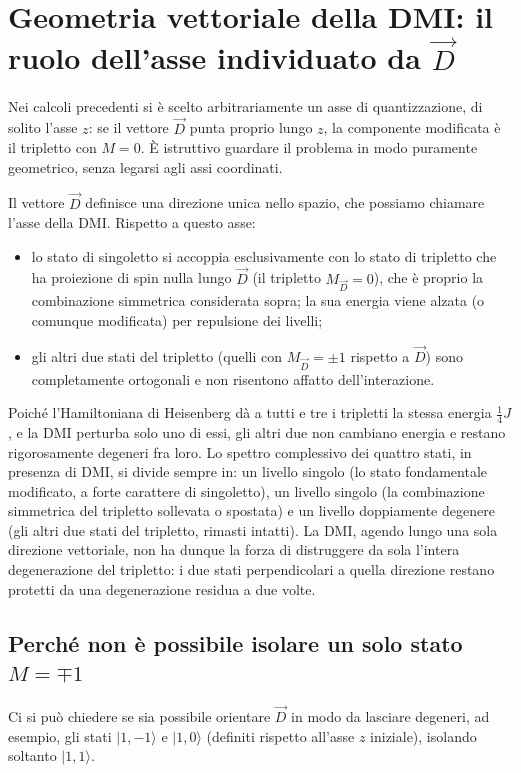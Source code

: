 \documentclass[11pt,a4paper]{article}
\begin{document}
\section{Geometria vettoriale della DMI: il ruolo dell'asse individuato da $\vec D$}

Nei calcoli precedenti si \`e scelto arbitrariamente un asse di quantizzazione, di
solito l'asse $z$: se il vettore $\vec D$ punta proprio lungo $z$, la componente
modificata \`e il tripletto con $M=0$. \`E istruttivo guardare il problema in modo
puramente geometrico, senza legarsi agli assi coordinati.

Il vettore $\vec D$ definisce una direzione unica nello spazio, che possiamo chiamare
l'asse della DMI. Rispetto a questo asse:
\begin{itemize}
\item lo stato di singoletto si accoppia esclusivamente con lo stato di tripletto che
ha proiezione di spin nulla lungo $\vec D$ (il tripletto $M_{\vec D}=0$), che \`e
proprio la combinazione simmetrica considerata sopra; la sua energia viene alzata (o
comunque modificata) per repulsione dei livelli;
\item gli altri due stati del tripletto (quelli con $M_{\vec D}=\pm1$ rispetto a $\vec
D$) sono completamente ortogonali e non risentono affatto dell'interazione.
\end{itemize}
Poich\'e l'Hamiltoniana di Heisenberg d\`a a tutti e tre i tripletti la stessa energia
$\tfrac14 J$, e la DMI perturba solo uno di essi, gli altri due non cambiano energia e
restano rigorosamente degeneri fra loro. Lo spettro complessivo dei quattro stati, in
presenza di DMI, si divide sempre in: un livello singolo (lo stato fondamentale
modificato, a forte carattere di singoletto), un livello singolo (la combinazione
simmetrica del tripletto sollevata o spostata) e un livello doppiamente degenere (gli
altri due stati del tripletto, rimasti intatti). La DMI, agendo lungo una sola
direzione vettoriale, non ha dunque la forza di distruggere da sola l'intera
degenerazione del tripletto: i due stati perpendicolari a quella direzione restano
protetti da una degenerazione residua a due volte.

\subsection{Perch\'e non \`e possibile isolare un solo stato $M=\mp1$}

Ci si pu\`o chiedere se sia possibile orientare $\vec D$ in modo da lasciare degeneri,
ad esempio, gli stati $|1,-1\rangle$ e $|1,0\rangle$ (definiti rispetto all'asse $z$
iniziale), isolando soltanto $|1,1\rangle$.
\end{document}
